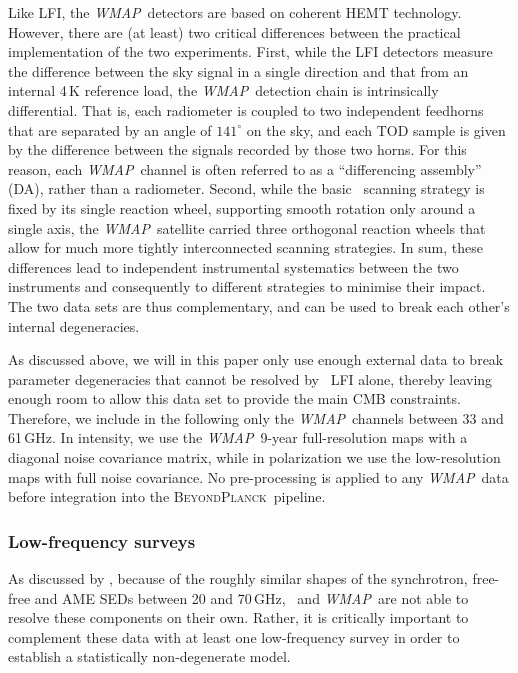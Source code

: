 \documentclass[twocolumn]{aa}
\def\WMAP{\emph{WMAP}}
\newcommand{\BP}{\textsc{BeyondPlanck}}
\begin{document}
Like LFI, the \WMAP\ detectors are based on coherent HEMT
technology. However, there are (at least) two critical differences
between the practical implementation of the two experiments. First,
while the LFI detectors measure the difference between the sky signal
in a single direction and that from an internal 4\,K reference load,
the \WMAP\ detection chain is intrinsically differential. That is,
each radiometer is coupled to two independent feedhorns that are
separated by an angle of $141^{\circ}$ on the sky, and each TOD sample
is given by the difference between the signals recorded by those two
horns. For this reason, each \WMAP\ channel is often referred to as a
``differencing assembly'' (DA), rather than a radiometer. Second,
while the basic \Planck\ scanning strategy is fixed by its single
reaction wheel, supporting smooth rotation only around a single axis,
the \WMAP\ satellite carried three orthogonal reaction wheels that
allow for much more tightly interconnected scanning strategies. In
sum, these differences lead to independent instrumental systematics
between the two instruments and consequently to different strategies
to minimise their impact.  The two data sets are thus complementary,
and can be used to break each other's internal degeneracies.

As discussed above, we will in this paper only use enough external
data to break parameter degeneracies that cannot be resolved by
\Planck\ LFI alone, thereby leaving enough room to allow this data set
to provide the main CMB constraints. Therefore, we include in the
following only the \WMAP\ channels between 33 and 61\,GHz. In
intensity, we use the \WMAP\ 9-year full-resolution maps with a
diagonal noise covariance matrix, while in polarization we use the
low-resolution maps with full noise covariance. No pre-processing is
applied to any \WMAP\ data before integration into the \BP\ pipeline.

\subsubsection{Low-frequency surveys}

As discussed by \citet{planck2014-a12}, because of the roughly similar
shapes of the synchrotron, free-free and AME SEDs between 20 and
70\,GHz, \Planck\ and \WMAP\ are not able to resolve these components
on their own. Rather, it is critically important to complement these
data with at least one low-frequency survey in order to establish a
statistically non-degenerate model.
\end{document}
